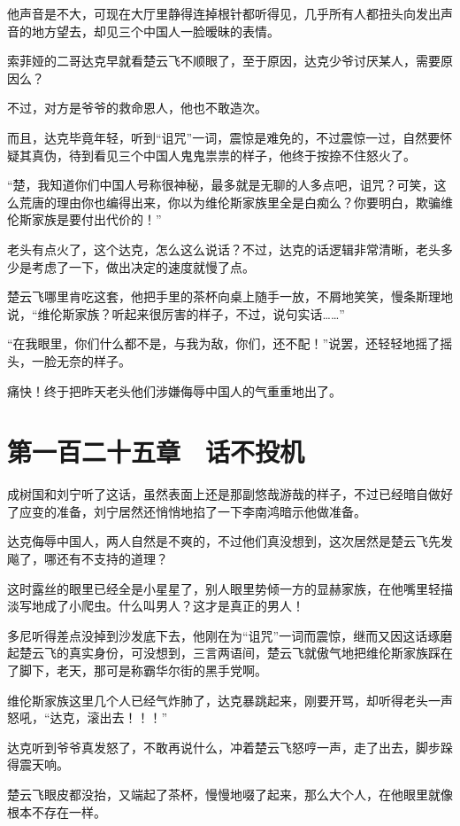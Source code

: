 他声音是不大，可现在大厅里静得连掉根针都听得见，几乎所有人都扭头向发出声音的地方望去，却见三个中国人一脸暧昧的表情。

索菲娅的二哥达克早就看楚云飞不顺眼了，至于原因，达克少爷讨厌某人，需要原因么？

不过，对方是爷爷的救命恩人，他也不敢造次。

而且，达克毕竟年轻，听到“诅咒”一词，震惊是难免的，不过震惊一过，自然要怀疑其真伪，待到看见三个中国人鬼鬼祟祟的样子，他终于按捺不住怒火了。

“楚，我知道你们中国人号称很神秘，最多就是无聊的人多点吧，诅咒？可笑，这么荒唐的理由你也编得出来，你以为维伦斯家族里全是白痴么？你要明白，欺骗维伦斯家族是要付出代价的！”

老头有点火了，这个达克，怎么这么说话？不过，达克的话逻辑非常清晰，老头多少是考虑了一下，做出决定的速度就慢了点。

楚云飞哪里肯吃这套，他把手里的茶杯向桌上随手一放，不屑地笑笑，慢条斯理地说，“维伦斯家族？听起来很厉害的样子，不过，说句实话……”

“在我眼里，你们什么都不是，与我为敌，你们，还不配！”说罢，还轻轻地摇了摇头，一脸无奈的样子。

痛快！终于把昨天老头他们涉嫌侮辱中国人的气重重地出了。

\section{第一百二十五章　话不投机}

成树国和刘宁听了这话，虽然表面上还是那副悠哉游哉的样子，不过已经暗自做好了应变的准备，刘宁居然还悄悄地掐了一下李南鸿暗示他做准备。

达克侮辱中国人，两人自然是不爽的，不过他们真没想到，这次居然是楚云飞先发飚了，哪还有不支持的道理？

这时露丝的眼里已经全是小星星了，别人眼里势倾一方的显赫家族，在他嘴里轻描淡写地成了小爬虫。什么叫男人？这才是真正的男人！

多尼听得差点没掉到沙发底下去，他刚在为“诅咒”一词而震惊，继而又因这话琢磨起楚云飞的真实身份，可没想到，三言两语间，楚云飞就傲气地把维伦斯家族踩在了脚下，老天，那可是称霸华尔街的黑手党啊。

维伦斯家族这里几个人已经气炸肺了，达克暴跳起来，刚要开骂，却听得老头一声怒吼，“达克，滚出去！！！”

达克听到爷爷真发怒了，不敢再说什么，冲着楚云飞怒哼一声，走了出去，脚步跺得震天响。

楚云飞眼皮都没抬，又端起了茶杯，慢慢地啜了起来，那么大个人，在他眼里就像根本不存在一样。

